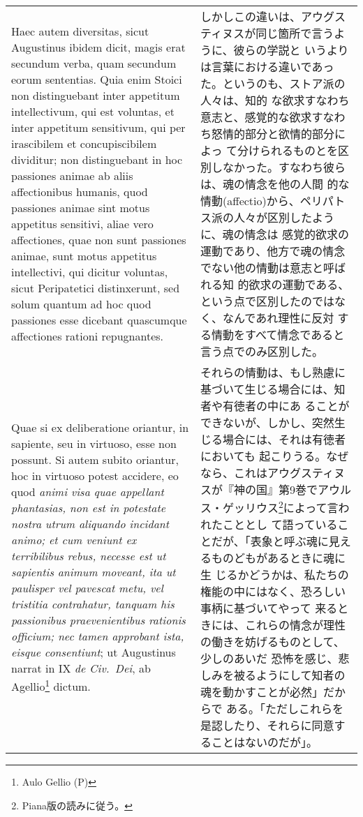 \documentclass[10pt]{jsarticle}
\begin{document}
\begin{longtable}{p{21em}p{21em}}
\\

 Haec autem diversitas, sicut Augustinus ibidem dicit, magis erat
 secundum verba, quam secundum eorum sententias. Quia enim Stoici non
 distinguebant inter appetitum intellectivum, qui est voluntas, et
 inter appetitum sensitivum, qui per irascibilem et concupiscibilem
 dividitur; non distinguebant in hoc passiones animae ab aliis
 affectionibus humanis, quod passiones animae sint motus appetitus
 sensitivi, aliae vero affectiones, quae non sunt passiones animae,
 sunt motus appetitus intellectivi, qui dicitur voluntas, sicut
 Peripatetici distinxerunt, sed solum quantum ad hoc quod passiones
 esse dicebant quascumque affectiones rationi repugnantes.

&

しかしこの違いは、アウグスティヌスが同じ箇所で言うように、彼らの学説と
いうよりは言葉における違いであった。というのも、ストア派の人々は、知的
な欲求すなわち意志と、感覚的な欲求すなわち怒情的部分と欲情的部分によっ
て分けられるものとを区別しなかった。すなわち彼らは、魂の情念を他の人間
的な情動(affectio)から、ペリパトス派の人々が区別したように、魂の情念は
感覚的欲求の運動であり、他方で魂の情念でない他の情動は意志と呼ばれる知
的欲求の運動である、という点で区別したのではなく、なんであれ理性に反対
する情動をすべて情念であると言う点でのみ区別した。
 
\\


 Quae si ex deliberatione oriantur, in sapiente, seu in virtuoso, esse
 non possunt. Si autem subito oriantur, hoc in virtuoso potest
 accidere, eo quod {\itshape animi visa quae appellant phantasias, non
 est in potestate nostra utrum aliquando incidant animo; et cum
 veniunt ex terribilibus rebus, necesse est ut sapientis animum
 moveant, ita ut paulisper vel pavescat metu, vel tristitia
 contrahatur, tanquam his passionibus praevenientibus rationis
 officium; nec tamen approbant ista, eisque consentiunt}; ut
 Augustinus narrat in IX {\itshape de Civ.~Dei}, ab Agellio\footnote{Aulo Gellio (P)} dictum.

&

それらの情動は、もし熟慮に基づいて生じる場合には、知者や有徳者の中にあ
ることができないが、しかし、突然生じる場合には、それは有徳者においても
起こりうる。なぜなら、これはアウグスティヌスが『神の国』第9巻でアウル
ス・ゲッリウス\footnote{Piana版の読みに従う。}によって言われたこととし
て語っていることだが、「表象と呼ぶ魂に見えるものどもがあるときに魂に生
じるかどうかは、私たちの権能の中にはなく、恐ろしい事柄に基づいてやって
来るときには、これらの情念が理性の働きを妨げるものとして、少しのあいだ
恐怖を感じ、悲しみを被るようにして知者の魂を動かすことが必然」だからで
ある。「ただしこれらを是認したり、それらに同意することはないのだが」。
 

\end{longtable}
\end{document}
